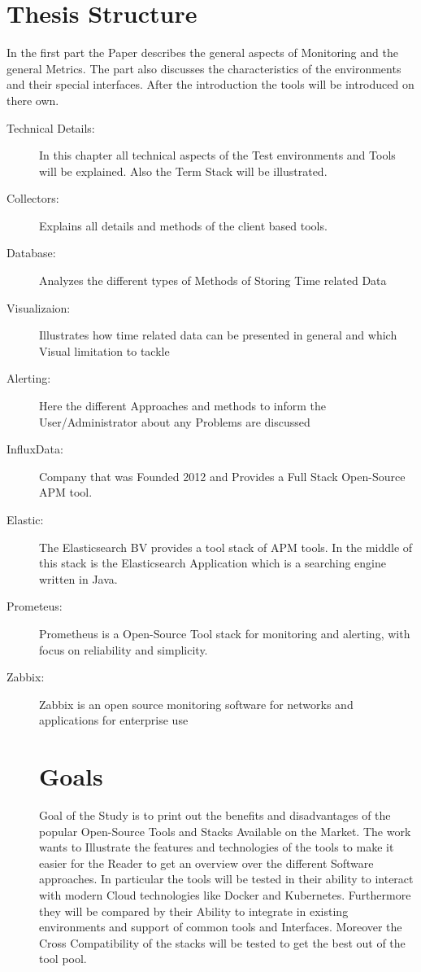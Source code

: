 \section*{Thesis Structure}
In the first part the Paper describes the general aspects of Monitoring and the general Metrics. The part also discusses the characteristics of the environments and their special interfaces. After the introduction the tools will be introduced on there own. 
\begin{description}
\item[Technical Details:] In this chapter all technical aspects of the Test environments and Tools will be explained. Also the Term Stack will be illustrated.  
\item[Collectors:] Explains all details and methods of the client based tools.
\item[Database:] Analyzes the different types of Methods of Storing Time related Data
\item[Visualizaion:] Illustrates how time related data can be presented in general and which Visual limitation to tackle  \\
\item[Alerting:] Here the different Approaches and methods to inform the User/Administrator about any Problems are discussed 
\\
\item[InfluxData:] Company that was Founded 2012 and Provides a Full Stack Open-Source APM tool.
\item[Elastic:] The Elasticsearch BV provides a tool stack of APM tools. In the middle of this stack is the Elasticsearch Application which is a searching engine written in Java. 
\item[Prometeus:]Prometheus is a Open-Source Tool stack for monitoring and alerting, with focus on reliability and simplicity.
\item[Zabbix:]Zabbix is an open source monitoring software for networks and applications for enterprise use
\section*{Goals}
Goal of the Study is to print out the benefits and disadvantages of the popular Open-Source Tools and Stacks Available on the Market. The work wants to Illustrate the features and technologies of the tools to make it easier for the Reader to get an overview over the different Software approaches. In particular the tools will be tested in their ability to interact with modern Cloud technologies like Docker and Kubernetes. Furthermore they will be compared by their Ability to integrate in existing environments and support of common tools and Interfaces. Moreover the Cross Compatibility of the stacks will be tested to get the best out of the tool pool.
\end{description}
